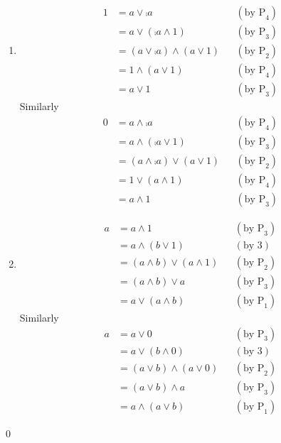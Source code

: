 \begin{myproof}
\begin{enumerate}
            \item 
            \begin{align*}
                1&=a\vee\comp{a} && (\text{by P}_4)\\
                &=a\vee(\comp{a}\wedge1) && (\text{by P}_3)\\
                &=(a\vee\comp{a})\wedge(a\vee1) && (\text{by P}_2)\\
                &=1\wedge(a\vee1) && (\text{by P}_4)\\
                &=a\vee 1 && (\text{by P}_3)
            \end{align*}
            Similarly 
            \begin{align*}
                0&=a\wedge\comp{a} && (\text{by P}_4)\\
                &=a\wedge(\comp{a}\vee1) && (\text{by P}_3)\\
                &=(a\wedge\comp{a})\vee(a\vee1) && (\text{by P}_2)\\
                &=1\vee(a\wedge1) && (\text{by P}_4)\\
                &=a\wedge 1 && (\text{by P}_3)
            \end{align*}

            \item 
            \begin{align*}
                a&=a\wedge1 && (\text{by P}_3)\\
                &=a\wedge(b\vee1) && (\text{by 3})\\
                &=(a\wedge b)\vee(a\wedge1) && (\text{by P}_2)\\
                &=(a\wedge b)\vee a && (\text{by P}_3)\\
                &=a\vee(a\wedge b) && (\text{by P}_1)
            \end{align*}
            Similarly
            \begin{align*}
                a&=a\vee0 && (\text{by P}_3)\\
                &=a\vee(b\wedge0) && (\text{by 3})\\
                &=(a\vee b)\wedge(a\vee0) && (\text{by P}_2)\\
                &=(a\vee b)\wedge a && (\text{by P}_3)\\
                &=a\wedge(a\vee b) && (\text{by P}_1)
            \end{align*}
        \end{enumerate}\qed
\end{myproof}

